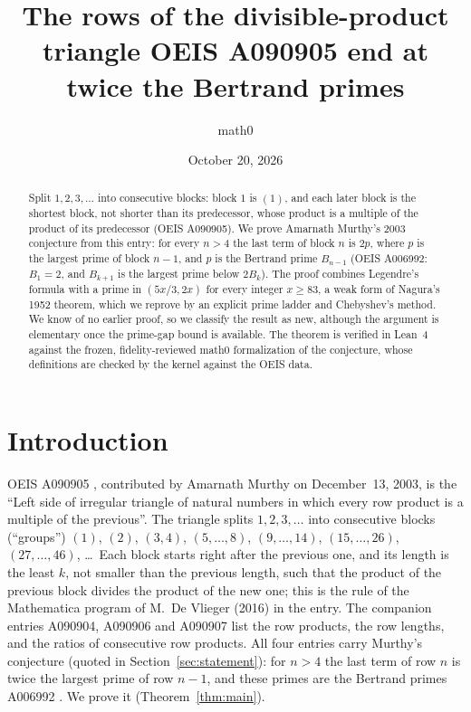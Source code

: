 \documentclass[11pt]{amsart}
\title[The divisible-product triangle A090905 and the Bertrand primes]{The rows of the divisible-product triangle OEIS A090905 end at twice the Bertrand primes}
\author{math0}
\date{October 20, 2026}
\theoremstyle{plain}
\theoremstyle{definition}
\begin{document}
\begin{abstract}
Split $1,2,3,\dots$ into consecutive blocks: block $1$ is $(1)$, and each later block is the shortest block, not shorter than its predecessor, whose product is a multiple of the product of its predecessor (OEIS A090905).
We prove Amarnath Murthy's 2003 conjecture from this entry: for every $n>4$ the last term of block $n$ is $2p$, where $p$ is the largest prime of block $n-1$, and $p$ is the Bertrand prime $B_{n-1}$ (OEIS A006992: $B_1=2$, and $B_{k+1}$ is the largest prime below $2B_k$).
The proof combines Legendre's formula with a prime in $(5x/3,2x)$ for every integer $x\ge83$, a weak form of Nagura's 1952 theorem, which we reprove by an explicit prime ladder and Chebyshev's method.
We know of no earlier proof, so we classify the result as new, although the argument is elementary once the prime-gap bound is available.
The theorem is verified in Lean~4 against the frozen, fidelity-reviewed math0 formalization of the conjecture, whose definitions are checked by the kernel against the OEIS data.
\end{abstract}
\maketitle

\section{Introduction}

OEIS A090905 \cite{A090905}, contributed by Amarnath Murthy on December~13, 2003, is the ``Left side of irregular triangle of natural numbers in which every row product is a multiple of the previous''. The triangle splits $1,2,3,\dots$ into consecutive blocks (``groups'') $(1)$, $(2)$, $(3,4)$, $(5,\dots,8)$, $(9,\dots,14)$, $(15,\dots,26)$, $(27,\dots,46)$, \dots\ Each block starts right after the previous one, and its length is the least $k$, not smaller than the previous length, such that the product of the previous block divides the product of the new one; this is the rule of the Mathematica program of M.~De Vlieger (2016) in the entry. The companion entries A090904, A090906 and A090907 \cite{A090904} list the row products, the row lengths, and the ratios of consecutive row products. All four entries carry Murthy's conjecture (quoted in Section~\ref{sec:statement}): for $n>4$ the last term of row $n$ is twice the largest prime of row $n-1$, and these primes are the Bertrand primes A006992 \cite{A006992}. We prove it (Theorem~\ref{thm:main}).
\end{document}
